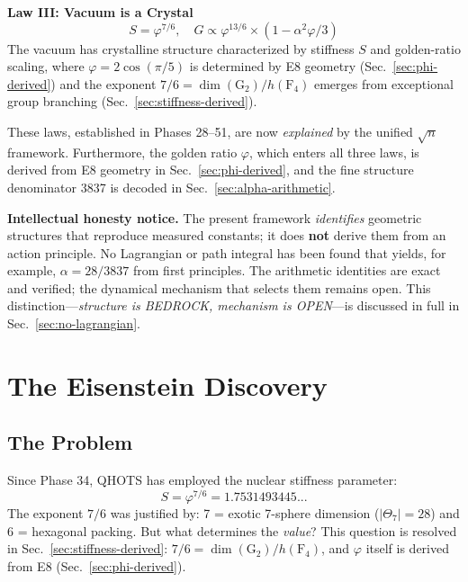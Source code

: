 \documentclass[aps,prd,twocolumn,superscriptaddress,floatfix,nofootinbib]{revtex4-2}
\theoremstyle{definition}
\theoremstyle{remark}
\newcommand{\vp}{\varphi}
\newcommand{\Th}{\Theta}
\begin{document}
\textbf{Law III: Vacuum is a Crystal}
\begin{equation}
S = \vp^{7/6}, \quad G \propto \vp^{13/6} \times (1 - \alpha^2\vp/3)
\end{equation}
The vacuum has crystalline structure characterized by stiffness $S$ and golden-ratio scaling, where $\vp = 2\cos(\pi/5)$ is determined by E8 geometry (Sec.~\ref{sec:phi-derived}) and the exponent $7/6 = \dim(\text{G}_2)/h(\text{F}_4)$ emerges from exceptional group branching (Sec.~\ref{sec:stiffness-derived}).

These laws, established in Phases 28--51, are now \textit{explained} by the unified $\sqrt{n}$ framework. Furthermore, the golden ratio $\vp$, which enters all three laws, is derived from E8 geometry in Sec.~\ref{sec:phi-derived}, and the fine structure denominator 3837 is decoded in Sec.~\ref{sec:alpha-arithmetic}.

\medskip
\noindent\textbf{Intellectual honesty notice.}
The present framework \textit{identifies} geometric structures that reproduce measured constants; it does \textbf{not} derive them from an action principle. No Lagrangian or path integral has been found that yields, for example, $\alpha = 28/3837$ from first principles. The arithmetic identities are exact and verified; the dynamical mechanism that selects them remains open. This distinction---\textit{structure is BEDROCK, mechanism is OPEN}---is discussed in full in Sec.~\ref{sec:no-lagrangian}.

\section{The Eisenstein Discovery}

\subsection{The Problem}

Since Phase 34, QHOTS has employed the nuclear stiffness parameter:
\begin{equation}
S = \vp^{7/6} = 1.7531493445...
\end{equation}
The exponent $7/6$ was justified by: 7 = exotic 7-sphere dimension ($|\Th_7| = 28$) and 6 = hexagonal packing. But what determines the \textit{value}? This question is resolved in Sec.~\ref{sec:stiffness-derived}: $7/6 = \dim(\text{G}_2)/h(\text{F}_4)$, and $\vp$ itself is derived from E8 (Sec.~\ref{sec:phi-derived}).
\end{document}
